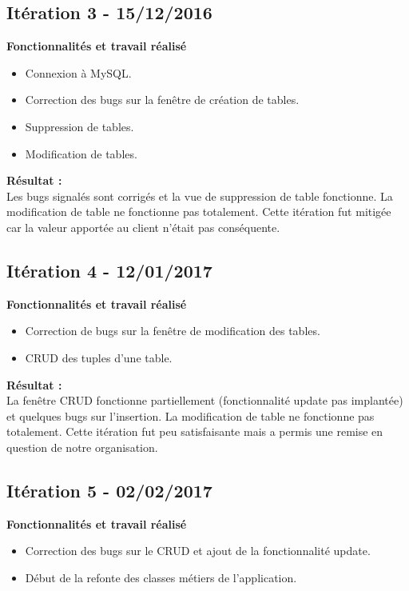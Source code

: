 \subsection{Itération 3 - 15/12/2016}
\textbf{Fonctionnalités et travail réalisé}
\begin{itemize}
\item Connexion à MySQL.
\item Correction des bugs sur la fenêtre de création de tables.
\item Suppression de tables.
\item Modification de tables.\\
\end{itemize}

\textbf{Résultat :}\\
Les bugs signalés sont corrigés et la vue de suppression de table fonctionne.
La modification de table ne fonctionne pas totalement.
Cette itération fut mitigée car la valeur apportée au client n'était pas conséquente. 


\subsection{Itération 4 - 12/01/2017}
\textbf{Fonctionnalités et travail réalisé}
\begin{itemize}
\item Correction de bugs sur la fenêtre de modification des tables.
\item CRUD des tuples d'une table.\\
\end{itemize}

\textbf{Résultat :}\\
La fenêtre CRUD fonctionne partiellement (fonctionnalité update pas implantée) et quelques bugs sur l'insertion. 
La modification de table ne fonctionne pas totalement.
Cette itération fut peu satisfaisante mais a permis une remise en question de notre organisation. 

\subsection{Itération 5 - 02/02/2017}
\textbf{Fonctionnalités et travail réalisé}
\begin{itemize}
\item Correction des bugs sur le CRUD et ajout de la fonctionnalité update.
\item Début de la refonte des classes métiers de l'application.\\
\end{itemize}

